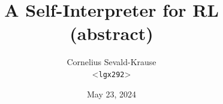 \documentclass{article}
\begin{document}
\title{A Self-Interpreter for RL (abstract)}
\author{
  Cornelius Sevald-Krause \\ <\texttt{lgx292}>
}
\date{May 23, 2024}

\maketitle

\begin{abstract}

\end{abstract}
\end{document}

